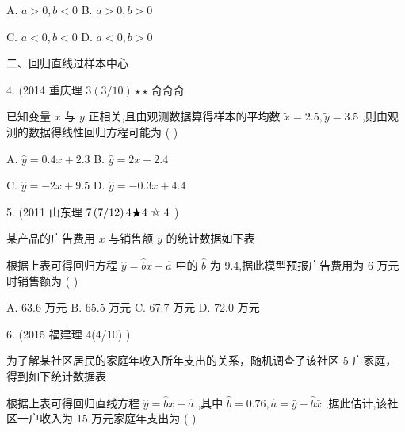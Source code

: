 \documentclass[10pt]{article}
\begin{document}
A. \(a > 0,b < 0\) B. \(a > 0,b > 0\)

C. \(a < 0,b < 0\) D. \(a < 0,b > 0\)

二、回归直线过样本中心

4. (2014 重庆理 \(3\left( {3/{10}}\right)  \star   \star\) 奇奇奇

已知变量 \(x\) 与 \(y\) 正相关,且由观测数据算得样本的平均数 \(\widetilde{x} = {2.5},\widetilde{y} = {3.5}\) ,则由观测的数据得线性回归方程可能为 ( )

A. \(\widehat{y} = {0.4x} + {2.3}\) B. \(\widehat{y} = {2x} - {2.4}\)

C. \(\widehat{y} =  - {2x} + {9.5}\) D. \(\widehat{y} =  - {0.3x} + {4.4}\)

5. (2011 山东理 \(7\left( {7/{12}}\right) 4\bigstar 4\text{  \ding{73}  }4\) )

某产品的广告费用 \(x\) 与销售额 \(y\) 的统计数据如下表

\begin{center}
\end{center}

根据上表可得回归方程 \(\widehat{y} = \widehat{b}x + \widehat{a}\) 中的 \(\widehat{b}\) 为 9.4,据此模型预报广告费用为 6 万元时销售额为 ( )

A. 63.6 万元 B. 65.5 万元 C. 67.7 万元 D. 72.0 万元

6. (2015 福建理 4(4/10)          )

为了解某社区居民的家庭年收入所年支出的关系，随机调查了该社区 5 户家庭， 得到如下统计数据表

\begin{center}
\end{center}

根据上表可得回归直线方程 \(\widehat{y} = \widehat{b}x + \widehat{a}\) ,其中 \(\widehat{b} = {0.76},\widehat{a} = \bar{y} - \widehat{b}\bar{x}\) ,据此估计,该社区一户收入为 15 万元家庭年支出为 ( )
\end{document}

